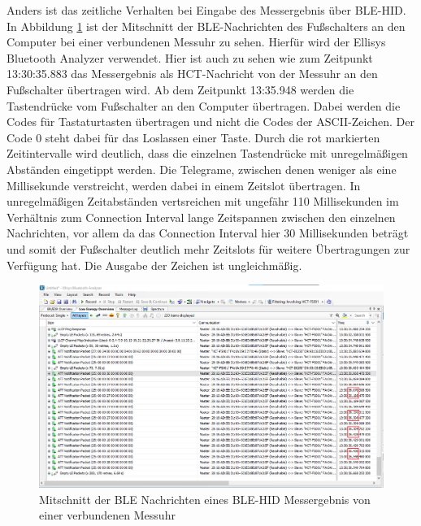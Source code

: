 Anders ist das zeitliche Verhalten bei Eingabe des Messergebnis über BLE-HID. In Abbildung \ref{fig:MitschnittEinerMessuhr} ist der Mitschnitt der BLE-Nachrichten des Fußschalters an den Computer bei einer verbundenen Messuhr zu sehen. Hierfür wird der Ellisys Bluetooth Analyzer verwendet. Hier ist auch zu sehen wie zum Zeitpunkt 13:30:35.883 das Messergebnis als HCT-Nachricht von der Messuhr an den Fußschalter übertragen wird. Ab dem Zeitpunkt 13:35.948 werden die Tastendrücke vom Fußschalter an den Computer übertragen. Dabei werden die Codes für Tastaturtasten übertragen und nicht die Codes der ASCII-Zeichen. Der Code 0 steht dabei für das Loslassen einer Taste. Durch die rot markierten Zeitintervalle wird deutlich, dass die einzelnen Tastendrücke mit unregelmäßigen Abständen eingetippt werden. Die Telegrame, zwischen denen weniger als eine Millisekunde verstreicht, werden dabei in einem Zeitslot übertragen. In unregelmäßigen Zeitabständen vertsreichen mit ungefähr 110 Millisekunden im Verhältnis zum Connection Interval lange Zeitspannen zwischen den einzelnen Nachrichten, vor allem da das Connection Interval hier 30 Millisekunden beträgt und somit der Fußschalter deutlich mehr Zeitslots für weitere Übertragungen zur Verfügung hat. Die Ausgabe der Zeichen ist ungleichmäßig.
\begin{figure}[H] 
	\centering
	\includegraphics[width=\textwidth]{figures/BLEHID1device.png}
	\caption{Mitschnitt der BLE Nachrichten eines BLE-HID Messergebnis von einer verbundenen Messuhr}
	\label{fig:MitschnittEinerMessuhr}
\end{figure}

